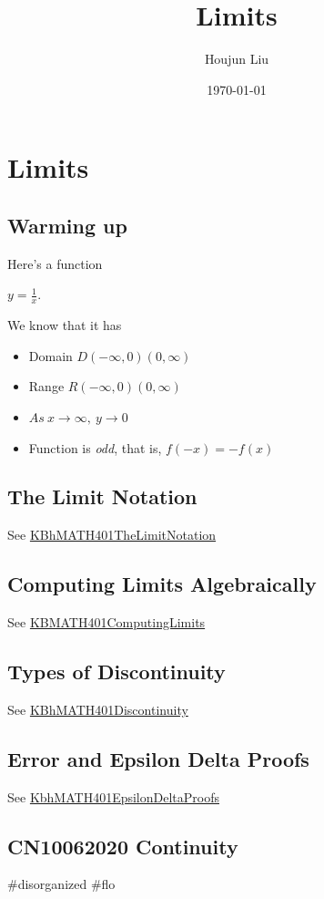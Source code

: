\documentclass[letterpaper]{article}
\author{Houjun Liu}
\date{\today}
\title{Limits}
\renewcommand{\tableofcontents}{}
\begin{document}
\tableofcontents



\section{Limits}
\label{sec:org6e912e6}
\subsection{Warming up}
\label{sec:org5dcc6af}
Here's a function

\(y = \frac{1}{x}\).

We know that it has

\begin{itemize}
\item Domain \(D (-\infty, 0)(0, \infty)\)
\item Range \(R (-\infty, 0)(0, \infty)\)
\item \(As\ x\to\infty,\ y\to0\)
\item Function is \emph{odd}, that is, \(f(-x) = -f(x)\)
\end{itemize}

\subsection{The Limit Notation}
\label{sec:org82174fb}
See \href{KBhMATH401TheLimitNotation.org}{KBhMATH401TheLimitNotation}

\subsection{Computing Limits Algebraically}
\label{sec:orgfebe03c}
See \href{KBMATH401ComputingLimits.org}{KBMATH401ComputingLimits}

\subsection{Types of Discontinuity}
\label{sec:org3907fe2}
See \href{KBhMATH401Discontinuity.org}{KBhMATH401Discontinuity}

\subsection{Error and Epsilon Delta Proofs}
\label{sec:org15e5810}
See
\href{KbhMATH401EpsilonDeltaProofs.org}{KbhMATH401EpsilonDeltaProofs}

\subsection{CN10062020 Continuity}
\label{sec:orgedd8739}
\#disorganized \#flo
\end{document}
